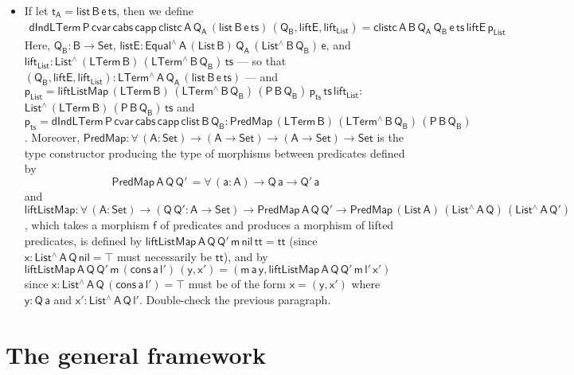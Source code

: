 \documentclass[9pt]{entcs}
\begin{document}
\begin{itemize}
\item If let $\mathsf{t_A = list \,B \,e \, ts}$, then we define
\begin{multline*}
  \mathsf{dIndLTerm \, P\, cvar \, cabs\, capp\, clistc \, A\, Q_A\, (list \,B \,e \, ts) \, (Q_B , liftE, lift_{List})
  = clistc \,A\,B\,Q_A\, Q_B\, e\, ts\, liftE\, p_{List} }
\end{multline*}
Here, $\mathsf{Q_B : B \to Set}$, $\mathsf{listE : Equal^{\wedge}\,
  A\, (List\,B)\, Q_A\, (List^{\wedge}\, B\, Q_B)\, e}$, and
$\mathsf{lift_{List}: List^{\wedge} \, (LTerm\, B) \,
  (LTerm^{\wedge}\, B\, Q_B) \, ts}$ --- so that $\mathsf{(Q_B ,
  liftE, lift_{List}): LTerm^{\wedge}\, A\, Q_A\, (list \,B \,e \,
  ts)}$ --- and
$\mathsf{p_{List} = liftListMap \, (LTerm\, B) \, (LTerm^{\wedge} \, B
  \, Q_B)\, (P\,B\,Q_B)\, p_{ts} \, ts\, lift_{List} : }$\\
$\mathsf{List^{\wedge}\,
  (LTerm\,B) \, (P\,B\,Q_B) \, ts}$ and
$\mathsf{ p_{ts} = dIndLTerm\, P\, cvar\, cabs\, capp\, clist\, B\,
  Q_B : PredMap\,(LTerm\,B) \,(LTerm^{\wedge}\, B\, Q_B) \,
  (P\,B\,Q_B)}$. Moreover, $\mathsf{PredMap : \forall\, (A : Set) \to
  (A \to Set) \to   (A \to Set) \to Set }$ is the type constructor
producing the type of morphisms between predicates defined by
\[\mathsf{PredMap \,A\, Q\,Q'\, = \forall\, (a : A) \to Q\,a \to
  Q'\,a}\] and $\mathsf{liftListMap : \forall\, (A : Set) \to (Q \, Q'
  : A \to Set) \to PredMap\,A\,Q\,Q' \to PredMap\,(List\,A)
  \,(List^{\wedge}\, A\, Q)\, (List^{\wedge}\, A\, Q')}$, which takes
a morphism $\mathsf{f}$ of predicates and produces a morphism of
lifted predicates, is defined by $\mathsf{liftListMap\, A\, Q\, Q'\,
  m\, nil\, tt = tt}$ (since $\mathsf{x : List^{\wedge}\, A\, Q\, nil
  = \top}$ must necessarily be $\mathsf{tt}$), and by
$\mathsf{liftListMap\, A\, Q\, Q'\, m\, (cons\, a\, l')\, (y, x') =
  (m\,a\,y, liftListMap\, A\, Q\, Q'\, m\, l'\, x')}$ since $\mathsf{x
  : List^{\wedge}\, A\, Q\, (cons\, a\, l') = \top}$ must be of the
form $\mathsf{x = (y, x')}$ where $\mathsf{y : Q\,a}$ and $\mathsf{x'
  : List^{\wedge}\, A\, Q\, l'}$. {\color{red} Double-check the
  previous paragraph.}
\end{itemize}



\section{The general framework}\label{sec:framework}
\end{document}
